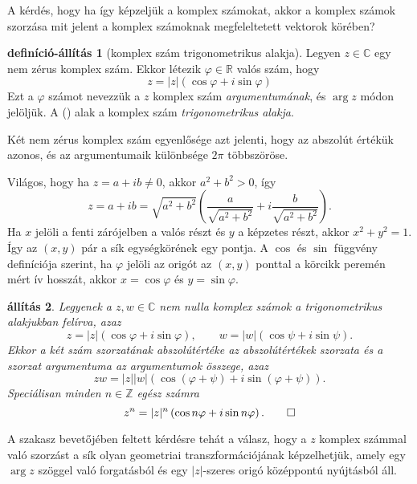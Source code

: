 \documentclass[9pt, a4paper, showtrims]{memoir}
\makeatletter
\renewenvironment{proof}[1][\proofname]
    {\par\pushQED{\qed}%
    \normalfont \topsep6\p@\@plus6\p@\relax
    \trivlist
    \item[\hskip\labelsep
        \itshape
    #1\@addpunct{:}]\ignorespaces}
    {\popQED\endtrivlist\@endpefalse}
\theoremstyle{plain}
\newtheorem{proposition}{állítás}[chapter]
\theoremstyle{remark}
\theoremstyle{definition}
\newtheorem{defprop}[proposition]{definíció-állítás}
\makeatother
\begin{document}
A kérdés, hogy ha így képzeljük a komplex számokat, 
akkor a komplex számok szorzása mit jelent a komplex számoknak megfeleltetett vektorok körében?

\begin{defprop}[komplex szám trigonometrikus alakja]
    Legyen $z\in \mathbb{C}$ egy nem zérus komplex szám.
    Ekkor létezik $\varphi\in\mathbb{R}$ valós szám, hogy
    \[
        z=
        |z|\left( \cos\varphi+i\sin\varphi \right)\tag{\dag}
    \]
    Ezt a $\varphi$ számot nevezzük a $z$ komplex szám \emph{argumentumának}, és $\arg z$ módon jelöljük.
    A (\dag) alak a komplex szám \emph{trigonometrikus alakja}.

    Két nem zérus komplex szám egyenlősége azt jelenti, hogy az abszolút értékük azonos,
    és az argumentumaik különbsége $2\pi$ többszöröse.
\end{defprop}
\begin{proof}
    Világos, hogy ha $z=a+ib\neq 0$, akkor $a^2+b^2>0$, így
    \[
        z=a+ib
        =
        \sqrt{a^2+b^2}\left( \frac{a}{\sqrt{a^2+b^2}}+i\frac{b}{\sqrt{a^2+b^2}} \right).
    \]
    Ha $x$ jelöli a fenti zárójelben a valós részt és $y$ a képzetes részt,
    akkor $x^2+y^2=1$.
    Így az $\left( x,y \right)$ pár a sík egységkörének egy pontja.
    A $\cos$ és $\sin$ függvény definíciója szerint,
    ha $\varphi$ jelöli az origót az $\left( x,y \right)$ 
    ponttal a körcikk peremén mért ív hosszát,
    akkor $x=\cos\varphi$ és $y=\sin\varphi$.
\end{proof}
\begin{proposition}
    Legyenek a $z,w\in \mathbb{C}$ nem nulla komplex számok a trigonometrikus alakjukban felírva, 
    azaz
    \[
        z=|z|\left( \cos\varphi+i\sin\varphi \right),\qquad 
        w=|w|\left( \cos\psi+i\sin\psi \right).
    \]
    Ekkor a két szám szorzatának abszolútértéke az abszolútértékek szorzata
    és a szorzat argumentuma az argumentumok összege, azaz
    \[
        zw=
        |z||w|\left( \cos\left( \varphi+\psi \right)+i\sin\left( \varphi+\psi \right) \right).
    \]
    Speciálisan minden $n\in\mathbb{Z}$ egész számra
    \[
        z^n=|z|^n\left( \cos n\varphi+i\sin n\varphi \right).\qedhere
    \]
\end{proposition}
A szakasz bevetőjében feltett kérdésre tehát a válasz,
hogy a $z$ komplex számmal való szorzást a sík olyan geometriai transzformációjának képzelhetjük,
amely egy $\arg z$ szöggel való forgatásból és egy $|z|$-szeres origó középpontú nyújtásból áll.
\end{document}
